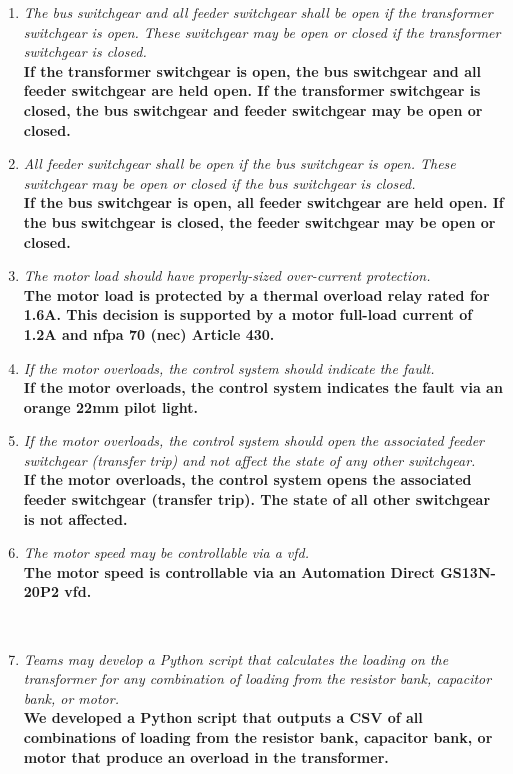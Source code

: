 \begin{enumerate}
	\item \emph{ The bus switchgear and all feeder switchgear shall be
		      open if the transformer switchgear is open. These switchgear may
		      be open or closed if the transformer switchgear is closed.}\\
	      \textbf{If the transformer switchgear is open, the bus switchgear
		      and all feeder switchgear are held
		      open. If the transformer switchgear is closed, the bus
		      switchgear and feeder switchgear
		      may be open or closed.}

	\item \emph{ All feeder switchgear shall be open if the bus
		      switchgear is open. These switchgear may be open or closed if the
		      bus switchgear is closed.}\\
	      \textbf{If the bus switchgear is open, all feeder switchgear are
		      held open. If the bus switchgear
		      is closed, the feeder switchgear may be open or closed.}

	\item \emph{ The motor load should have properly-sized over-current
		      protection.}\\
	      \textbf{The motor load is protected by a thermal overload relay rated for 1.6A.
		      This decision is supported by a motor full-load current of 1.2A and \gls{nfpa} 70 (\gls{nec}) Article 430.}

	\item \emph{ If the motor overloads, the control system should
		      indicate the fault.}\\
	      \textbf{If the motor overloads, the control system indicates the
		      fault via an orange 22mm pilot light.}

	\item \emph{ If the motor overloads, the control system should open
		      the associated feeder switchgear (transfer trip) and not affect
		      the state of any other switchgear.}\\
	      \textbf{If the motor overloads, the control system opens the
		      associated feeder switchgear
		      (transfer trip). The state of all other switchgear is not affected.}

	\item \emph{ The motor speed may be controllable via a
		      \gls{vfd}.}\\
	      \textbf{The motor speed is controllable via an Automation Direct GS13N-20P2
		      \gls{vfd}.}

	      \
	\item \emph {Teams may develop a Python script that calculates the loading on the transformer
		      for any combination of loading from the resistor bank, capacitor bank, or motor. }\\
	      \textbf{We developed a Python script that outputs a CSV of all combinations of loading
		      from the resistor bank, capacitor bank, or motor that produce an overload in the transformer.}
\end{enumerate}
